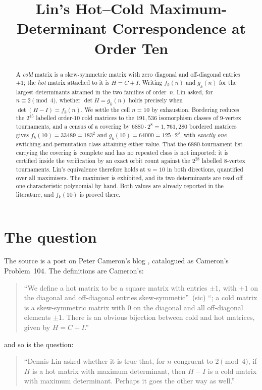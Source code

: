 \documentclass[11pt]{amsart}
\title[Lin's correspondence at order ten]
{Lin's Hot--Cold Maximum-Determinant Correspondence at Order Ten}
\date{}
\theoremstyle{remark}
\begin{document}
\begin{abstract}
A \emph{cold} matrix is a skew-symmetric matrix with zero diagonal and off-diagonal
entries $\pm1$; the \emph{hot} matrix attached to it is $H=C+I$. Writing $f_k(n)$ and
$g_k(n)$ for the largest determinants attained in the two families of order~$n$, Lin
asked, for $n\equiv2\pmod4$, whether $\det H=g_k(n)$ holds precisely when
$\det(H-I)=f_k(n)$. We settle the cell $n=10$ by exhaustion. Bordering reduces the
$2^{45}$ labelled order-$10$ cold matrices to the $191{,}536$ isomorphism classes of
$9$-vertex tournaments, and a census of a covering by $6880\cdot2^{8}=1{,}761{,}280$
bordered matrices gives $f_k(10)=33489=183^2$ and $g_k(10)=64000=125\cdot2^{9}$, with
\emph{exactly one} switching-and-permutation class attaining either value. That the
$6880$-tournament list carrying the covering is complete and has no repeated class is not
imported: it is certified inside the verification by an exact orbit count against the
$2^{28}$ labelled $8$-vertex tournaments. Lin's
equivalence therefore holds at $n=10$ in both directions, quantified over all
maximisers. The maximiser is exhibited, and its two determinants are read off one
characteristic polynomial by hand. Both values are already reported in the literature,
and $f_k(10)$ is proved there.
\end{abstract}

\maketitle

\section{The question}\label{sec:q}

The source is a post on Peter Cameron's blog \cite{Cameron2011}, catalogued as Cameron's
Problem~104. The definitions are Cameron's:

\begin{quote}
``We define a hot matrix to be a square matrix with entries $\pm1$, with $+1$ on the
diagonal and off-diagonal entries skew-symmetic''\ (sic) ``; a cold matrix is a
skew-symmetric matrix with $0$ on the diagonal and all off-diagonal elements $\pm1$.
There is an obvious bijection between cold and hot matrices, given by $H = C+I$.''
\end{quote}

\noindent and so is the question:

\begin{quote}
``Dennis Lin asked whether it is true that, for $n$ congruent to $2 \pmod 4$, if $H$ is a
hot matrix with maximum determinant, then $H-I$ is a cold matrix with maximum
determinant. Perhaps it goes the other way as well.''
\end{quote}
\end{document}
